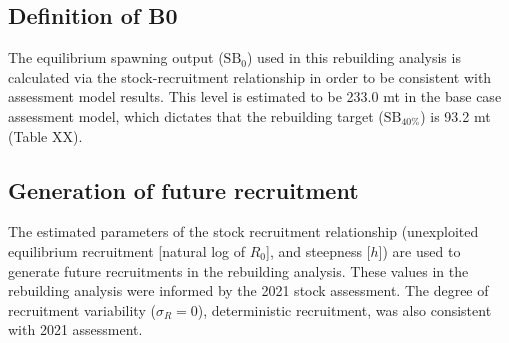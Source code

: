 \documentclass[11pt,
  english,
  a4paper,
]{article}
\begin{document}

\hypertarget{definition-of-b0}{%
\subsection{Definition of B0}\label{definition-of-b0}}

\leavevmode\tagmcend\tagstructend


The equilibrium spawning output ({\(\text{SB}_0\)\leavevmode\tagmcend\tagstructend}) used in this rebuilding analysis is calculated via the stock-recruitment relationship in order to be consistent with assessment model results. This level is estimated to be 233.0 mt in the base case assessment model, which dictates that the rebuilding target ({\(\text{SB}_{40\%}\)\leavevmode\tagmcend\tagstructend}) is 93.2 mt (Table XX).

\leavevmode\tagmcend\tagstructend\par


\hypertarget{generation-of-future-recruitment}{%
\subsection{Generation of future recruitment}\label{generation-of-future-recruitment}}

\leavevmode\tagmcend\tagstructend


The estimated parameters of the stock recruitment relationship (unexploited equilibrium recruitment {[}natural log of {\(R_0\)\leavevmode\tagmcend\tagstructend}{]}, and steepness {[}{\(h\)\leavevmode\tagmcend\tagstructend}{]}) are used to generate future recruitments in the rebuilding analysis. These values in the rebuilding analysis were informed by the 2021 stock assessment. The degree of recruitment variability ({\(\sigma_R = 0\)\leavevmode\tagmcend\tagstructend}), deterministic recruitment, was also consistent with 2021 assessment.

\leavevmode\tagmcend\tagstructend\par
\end{document}
